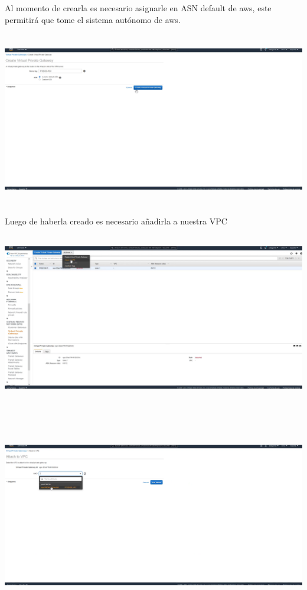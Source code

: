 \documentclass{article} %
\begin{document}
\noindent 

\noindent Al momento de crearla es necesario asignarle en ASN default de aws, este permitir\'{a} que tome el sistema aut\'{o}nomo de aws. 

\noindent 

\noindent 

\noindent \includegraphics*[width=6.70in, height=3.01in, trim=0.00in 0.27in 0.30in 0.00in]{image8}

\noindent 

\noindent Luego de haberla creado es necesario a\~{n}adirla a nuestra VPC

\noindent 

\noindent \includegraphics*[width=6.42in, height=2.90in, trim=0.00in 0.31in 0.38in 0.08in]{image9}

\noindent 

\noindent 

\noindent \includegraphics*[width=6.75in, height=3.68in, trim=0.00in 0.77in 2.83in 0.00in]{image10}
\end{document}
